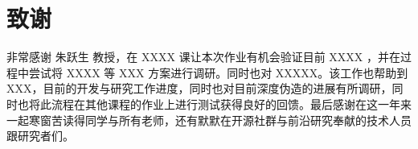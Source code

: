 \chapter{致谢}

非常感谢 朱跃生 教授，在 XXXX 课让本次作业有机会验证目前 XXXX ，并在过程中尝试将 XXXX 等 XXX 方案进行调研。同时也对 XXXXX。该工作也帮助到 XXX，目前的开发与研究工作进度，同时也对目前深度伪造的进展有所调研，同时也将此流程在其他课程的作业上进行测试获得良好的回馈。最后感谢在这一年来一起寒窗苦读得同学与所有老师，还有默默在开源社群与前沿研究奉献的技术人员跟研究者们。